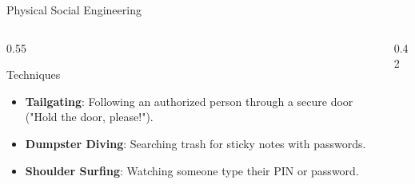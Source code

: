 \documentclass[aspectratio=169]{beamer}  %
\begin{document}
\begin{frame}{Physical Social Engineering}
    \begin{columns}[T]
        \begin{column}{0.55\textwidth}
            \begin{block}{Techniques}
                \footnotesize
                \begin{itemize}
                    \item \textbf{Tailgating}: Following an authorized person through a secure door ("Hold the door, please!").
                    \item \textbf{Dumpster Diving}: Searching trash for sticky notes with passwords.
                    \item \textbf{Shoulder Surfing}: Watching someone type their PIN or password.
                \end{itemize}
            \end{block}
        \end{column}
        \begin{column}{0.42\textwidth}
            \begin{center}
            \end{center}
        \end{column}
    \end{columns}
\end{frame}
\end{document}
